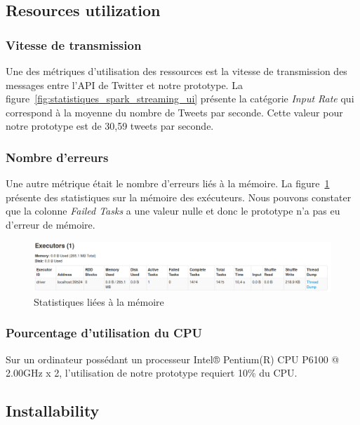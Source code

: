   \subsection{Resources utilization}
    \subsubsection{Vitesse de transmission}
      Une des métriques d'utilisation des ressources est la vitesse de transmission des messages entre l'API de Twitter et notre prototype. La figure~\ref{fig:statistiques_spark_streaming_ui} présente la catégorie \emph{Input Rate} qui correspond à la moyenne du nombre de Tweets par seconde. Cette valeur pour notre prototype est de 30,59 tweets par seconde.

    \subsubsection{Nombre d'erreurs}
      Une autre métrique était le nombre d'erreurs liés à la mémoire. La figure~\ref{fig:executor_spark_streaming_ui} présente des statistiques sur la mémoire des exécuteurs. Nous pouvons constater que la colonne \emph{Failed Tasks} a une valeur nulle et donc le prototype n'a pas eu d'erreur de mémoire.

      \begin{figure}
        \centering
        \includegraphics[width=1.0\textwidth]{images/executor_spark_ui.png}
        \caption{Statistiques liées à la mémoire}
        \label{fig:executor_spark_streaming_ui}
      \end{figure}

    \subsubsection{Pourcentage d'utilisation du CPU}
      Sur un ordinateur possédant un processeur Intel® Pentium(R) CPU P6100 @ 2.00GHz x 2, l'utilisation de notre prototype requiert 10\% du CPU.

  \subsection{Installability}
